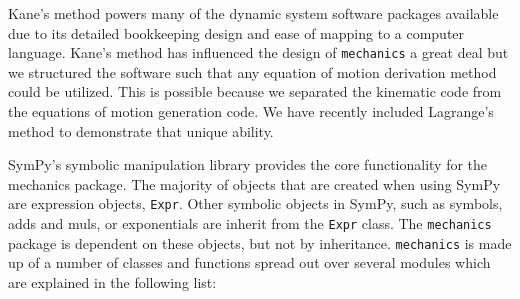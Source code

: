 \documentclass[twocolumn,10pt]{asme2e}
\begin{document}
Kane’s method powers many of the dynamic system software packages available
\cite{Sayers1990, Englighten2013} due to its detailed bookkeeping design and
ease of mapping to a computer language. Kane’s method  has influenced the
design of \verb|mechanics| a great deal but we structured the software such
that any equation of motion derivation method could be utilized. This is
possible because we separated the kinematic code from the equations of motion
generation code. We have recently included Lagrange’s method to demonstrate
that unique ability.

SymPy's symbolic manipulation library provides the core functionality for the
mechanics package. The majority of objects that are created when using SymPy
are expression objects, \verb|Expr|.  Other symbolic objects in SymPy, such as
symbols, adds and muls, or exponentials are inherit from the \verb|Expr| class.
The \verb|mechanics| package is dependent on these objects, but not by
inheritance. \verb|mechanics| is made up of a number of classes and functions
spread out over several modules which are explained in the following list:
%
\end{document}
